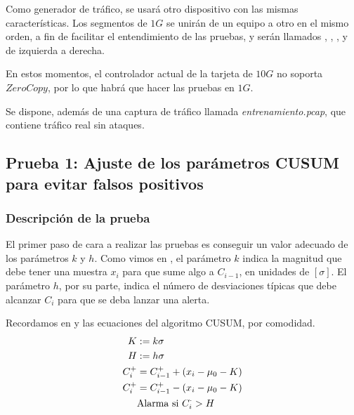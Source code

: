 Como generador de tráfico, se usará otro dispositivo con las mismas características. Los segmentos de $1G$ se unirán de 
un equipo a otro en el mismo orden, a fin de facilitar el entendimiento de las pruebas, y serán llamados 
, , , y  de izquierda a derecha.

En estos momentos, el controlador actual de la tarjeta de $10G$ no soporta $ZeroCopy$, por lo que habrá que hacer las 
pruebas en $1G$.

Se dispone, además de una captura de tráfico llamada \emph{entrenamiento.pcap}, que contiene tráfico real sin ataques.

\subsection{Prueba 1: Ajuste de los parámetros CUSUM para evitar falsos positivos}
\subsubsection{Descripción de la prueba}
El primer paso de cara a realizar las pruebas es conseguir un valor adecuado de los parámetros $k$ y $h$. Como vimos en 
, el parámetro $k$ indica la magnitud que debe tener una muestra $x_i$ para que sume algo a 
$C_{i-1}$, en unidades de $\left[\sigma\right]$. El parámetro $h$, por su parte, indica el número de desviaciones 
típicas que debe alcanzar $C_i$ para que se deba lanzar una alerta.

Recordamos en  y  las ecuaciones del algoritmo \gls{CUSUM}, por comodidad.
\begin{align}
 K &:= k\sigma \nonumber\\
 H &:= h\sigma \nonumber\\
 C_i^+ &= C_{i-1}^+ + (x_i-\mu_0-K) \LABEQ{PruebasCusumPos} \\
 C_i^+ &= C_{i-1}^+ - (x_i-\mu_0-K) \LABEQ{PruebasCusumNeg} \\
 &\text{Alarma si $C_i^\cdot > H$} \nonumber
\end{align}

